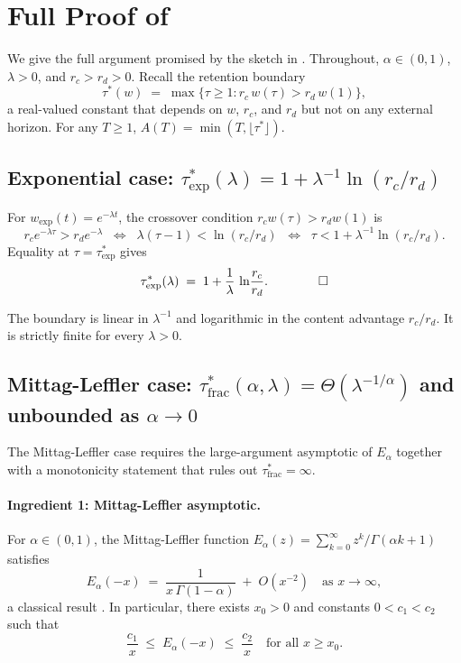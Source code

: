 \documentclass[11pt]{article}
\theoremstyle{plain}
\theoremstyle{definition}
\begin{document}
\appendix

\section{Full Proof of
\texorpdfstring{}{Theorem 5.1}}
\label{app:retention-proof}

We give the full argument promised by the sketch in
.  Throughout, $\alpha \in (0,1)$,
$\lambda > 0$, and $r_c > r_d > 0$.  Recall the
retention boundary
\[
\tau^*(w) \;=\; \max \big\{ \tau \geq 1
  : r_c\,w(\tau) > r_d\,w(1) \big\},
\]
a real-valued constant that depends on $w$, $r_c$,
and $r_d$ but not on any external horizon.  For any
$T \geq 1$, $A(T) = \min(T, \lfloor\tau^*\rfloor)$.

\subsection*{Exponential case: \boldmath
$\tau^*_{\mathrm{exp}}(\lambda) = 1 +
\lambda^{-1} \ln(r_c/r_d)$\unboldmath}

For $w_{\mathrm{exp}}(t) = e^{-\lambda t}$, the
crossover condition $r_c w(\tau) > r_d w(1)$ is
\[
r_c e^{-\lambda \tau} > r_d e^{-\lambda}
\;\;\Longleftrightarrow\;\;
\lambda(\tau - 1) < \ln(r_c / r_d)
\;\;\Longleftrightarrow\;\;
\tau < 1 + \lambda^{-1}\ln(r_c/r_d).
\]
Equality at $\tau = \tau^*_{\mathrm{exp}}$ gives
\[
\tau^*_{\mathrm{exp}}(\lambda)
\;=\; 1 + \frac{1}{\lambda}\,\ln\!\frac{r_c}{r_d}.
\qquad\qed
\]

The boundary is linear in $\lambda^{-1}$ and
logarithmic in the content advantage $r_c/r_d$.  It
is strictly finite for every $\lambda > 0$.

\subsection*{Mittag-Leffler case: \boldmath
$\tau^*_{\mathrm{frac}}(\alpha, \lambda) =
\Theta(\lambda^{-1/\alpha})$\unboldmath{} and
unbounded as
\boldmath$\alpha \to 0$\unboldmath}

The Mittag-Leffler case requires the large-argument
asymptotic of $E_\alpha$ together with a monotonicity
statement that rules out $\tau^*_{\mathrm{frac}} =
\infty$.

\paragraph{Ingredient 1: Mittag-Leffler asymptotic.}
For $\alpha \in (0, 1)$, the Mittag-Leffler function
$E_\alpha(z) = \sum_{k=0}^{\infty}
z^k / \Gamma(\alpha k + 1)$ satisfies
\begin{equation}\label{eq:ml-asymptotic}
E_\alpha(-x) \;=\;
\frac{1}{x\,\Gamma(1-\alpha)}
\;+\; O(x^{-2})
\quad\text{as } x \to \infty,
\end{equation}
a classical result \cite{gorenflo2014ml,
podlubny1999fractional}.  In particular, there
exists $x_0 > 0$ and constants
$0 < c_1 < c_2$ such that
\begin{equation}\label{eq:ml-sandwich}
\frac{c_1}{x} \;\leq\;
E_\alpha(-x) \;\leq\;
\frac{c_2}{x}
\quad\text{for all } x \geq x_0.
\end{equation}
\end{document}
